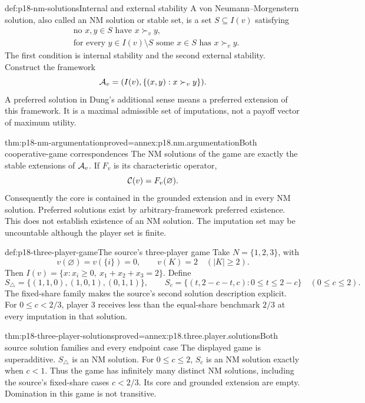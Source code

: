 \begin{hbdefinition}{def:p18-nm-solutions}{Internal and external stability}
A von Neumann--Morgenstern solution, also
called an NM solution or stable set, is
a set \(S\subseteq I(v)\) satisfying
\[
\begin{aligned}
 &\text{no }x,y\in S\text{ have }x\succ_v y,\\
 &\text{for every }y\in I(v)\setminus S
                       \text{ some }x\in S\text{ has }x\succ_v y.
\end{aligned}
\]
The first condition is internal stability
and the second external stability.
Construct the framework
\[
             {\cal A}_v=(I(v),\{(x,y):x\succ_v y\}).
\]
A preferred solution in Dung's additional
sense means a preferred extension of this
framework. It is a maximal admissible
set of imputations, not a payoff vector
of maximum utility.
\end{hbdefinition}

\begin{hbtheorem}{thm:p18-nm-argumentation}{proved=annex:p18.nm.argumentation}{Both cooperative-game correspondences}
The NM solutions of the game are exactly
the stable extensions of \({\cal A}_v\).
If \(F_v\) is its characteristic operator,
\[
                       {\cal C}(v)=F_v(\varnothing).
\]
Consequently the core is contained in the
grounded extension and in every NM solution.
Preferred solutions exist by arbitrary-framework
preferred existence. This does not establish
existence of an NM solution. The imputation
set may be uncountable although the player
set is finite.
\end{hbtheorem}

\begin{hbdefinition}{def:p18-three-player-game}{The source's three-player game}
Take \(N=\{1,2,3\}\), with
\[
 v(\varnothing)=v(\{i\})=0,\qquad
                 v(K)=2\quad(|K|\geq2).
\]
Then \(I(v)=\{x:x_i\geq0,\ x_1+x_2+x_3=2\}\).
Define
\[
 S_\triangle=\{(1,1,0),(1,0,1),(0,1,1)\},
 \qquad
 S_c=\{(t,2-c-t,c):0\leq t\leq2-c\}\quad(0\leq c\leq2).
\]
The fixed-share family makes the source's
second solution description explicit.
For \(0\leq c<2/3\), player 3 receives
less than the equal-share benchmark \(2/3\)
at every imputation in that solution.
\end{hbdefinition}

\begin{hbtheorem}{thm:p18-three-player-solutions}{proved=annex:p18.three.player.solutions}{Both source solution families and every endpoint case}
The displayed game is superadditive.
\(S_\triangle\) is an NM solution.
For \(0\leq c\leq2\), \(S_c\) is an
NM solution exactly when \(c<1\).
Thus the game has infinitely many
distinct NM solutions, including the
source's fixed-share cases \(c<2/3\).
Its core and grounded extension are
empty. Domination in this game is
not transitive.
\end{hbtheorem}

